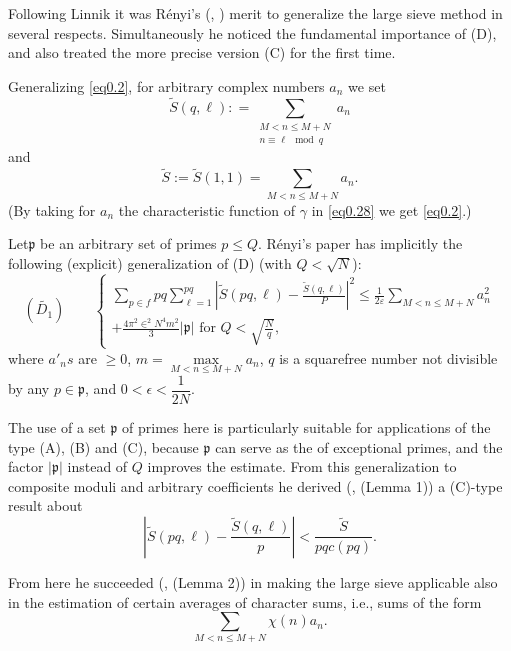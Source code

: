 Following Linnik it was R\'enyi's (\cite{key1}, \cite{key2})  merit to
generalize the 
large sieve method in several respects. Simultaneously he noticed the
fundamental importance of (D), and also treated the more precise
version (C) for the first time. 

Generalizing \eqref{eq0.2}, for arbitrary complex numbers $a_n$ we set 
\begin{equation*}
\tilde{S}(q,\ell) : = \sum _{\substack{M<n\leq M+N\\ n\equiv \ell
    \mod q}}a_{n}\tag{0.28}\label{eq0.28} 
\end{equation*}
and
\begin{equation*}
\tilde{S}:= \tilde{S}(1,1)= \sum_{M<n \leq
  M+N}a_{n}.\tag{0.29}\label{eq0.29}  
\end{equation*}
(By taking for $a_n$ the characteristic function of $\gamma$ in
\eqref{eq0.28} we get \eqref{eq0.2}.) 

Let\pageoriginale $\mathfrak{p}$ be an arbitrary set of primes $p\leq
Q$. R\'enyi's 
paper \cite{key2} has implicitly the following (explicit) generalization of
(D) (with $Q< \sqrt{N}$): 
\begin{equation*}
(\tilde{D_1}) \qquad 
\begin{cases}
\sum\limits_{p \in f}pq \sum\limits ^{pq}_{\ell=1}|\tilde{S}(pq,\ell)
-\frac{\tilde{S}(q,\ell)}{P}|^2 \leq
\frac{1}{2\varepsilon}\sum\limits_{M<n\leq M+N} a^2_n\\ 
+ 
 \frac{4\pi^2\in^2N^4m^2}{3}|\mathfrak{p}| \text{ for }
 Q<\sqrt{\frac{N}{q}},
\end{cases}\tag{0.30} \label{eq0.30}
\end{equation*}
where $a'_n s$ are $\geq 0$, $m = \underset{M < n \leq M+N}{\max} a_n$, $q$ is a
squarefree number not divisible by any $p \in \mathfrak{p}$, and $0 <
\epsilon < \dfrac{1}{2N}$.  

The use of a set $\mathfrak{p}$ of primes here is particularly
suitable for applications of the type (A), (B) and (C), because
$\mathfrak{p}$ can serve as the of exceptional primes, and the factor
$|\mathfrak{p}|$ instead of $Q$ improves the estimate. From this
generalization to composite moduli and arbitrary coefficients he
derived (\cite{key1}, (Lemma 1)) a (C)-type result about 
\begin{equation*}
| \tilde {S}(pq,\ell ) - \frac{\tilde{S}(q, \ell)}{p}| <
\frac{\tilde{S}}{pq c(pq)}.\tag{0.31}\label{eq0.31}
\end{equation*}

From here he succeeded (\cite{key1}, (Lemma 2)) in making the large sieve
applicable also in the estimation of certain averages of character
sums, i.e., sums of the form 
\begin{equation*}
\sum_{M<n \leq M+N}\chi(n) a_n .\tag{0.32}\label{eq0.32} 
\end{equation*} 

